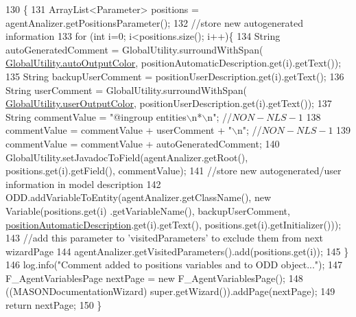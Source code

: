 \begin{DoxyCode}
130                                     \{ 
131         ArrayList<Parameter> positions = agentAnalizer.getPositionsParameter();
132         \textcolor{comment}{//store new autogenerated information}
133         \textcolor{keywordflow}{for} (\textcolor{keywordtype}{int} i=0; i<positions.size(); i++)\{
134             String autoGeneratedComment = GlobalUtility.surroundWithSpan(
      \hyperlink{classit_1_1isislab_1_1masonhelperdocumentation_1_1analizer_1_1_global_utility_a42aa676ad1ff27c42cd4aab651ff2a35}{GlobalUtility.autoOutputColor}, positionAutomaticDescription.get(i).getText());
135             String backupUserComment = positionUserDescription.get(i).getText();
136             String userComment = GlobalUtility.surroundWithSpan(
      \hyperlink{classit_1_1isislab_1_1masonhelperdocumentation_1_1analizer_1_1_global_utility_aec864cd710b27ece609c5a6093211ff4}{GlobalUtility.userOutputColor}, positionUserDescription.get(i).getText());
137             String commentValue = \textcolor{stringliteral}{"@ingroup entities\(\backslash\)n*\(\backslash\)n"}; \textcolor{comment}{//$NON-NLS-1$}
138             commentValue = commentValue + userComment + \textcolor{stringliteral}{"\(\backslash\)n"}; \textcolor{comment}{//$NON-NLS-1$}
139             commentValue = commentValue + autoGeneratedComment;
140             GlobalUtility.setJavadocToField(agentAnalizer.getRoot(), positions.get(i).getField(), 
      commentValue);
141             \textcolor{comment}{//store new autogenerated/user information in model description}
142             ODD.addVariableToEntity(agentAnalizer.getClassName(), \textcolor{keyword}{new} Variable(positions.get(i)
      .getVariableName(), backupUserComment, \hyperlink{classit_1_1isislab_1_1masonhelperdocumentation_1_1mason_1_1wizards_1_1_e___agent_position_page_ad8c6b4b4f5efd73f4e653ddeddd6bc2d}{positionAutomaticDescription}.get(i).getText(), 
      positions.get(i).getInitializer()));
143             \textcolor{comment}{//add this parameter to 'visitedParameters' to exclude them from next wizardPage}
144             agentAnalizer.getVisitedParameters().add(positions.get(i));
145         \}
146         log.info(\textcolor{stringliteral}{"Comment added to positions variables and to ODD object..."}); 
147         F\_AgentVariablesPage nextPage = \textcolor{keyword}{new} F\_AgentVariablesPage();
148         ((MASONDocumentationWizard) super.getWizard()).addPage(nextPage);
149         \textcolor{keywordflow}{return} nextPage; 
150     \}
\end{DoxyCode}
